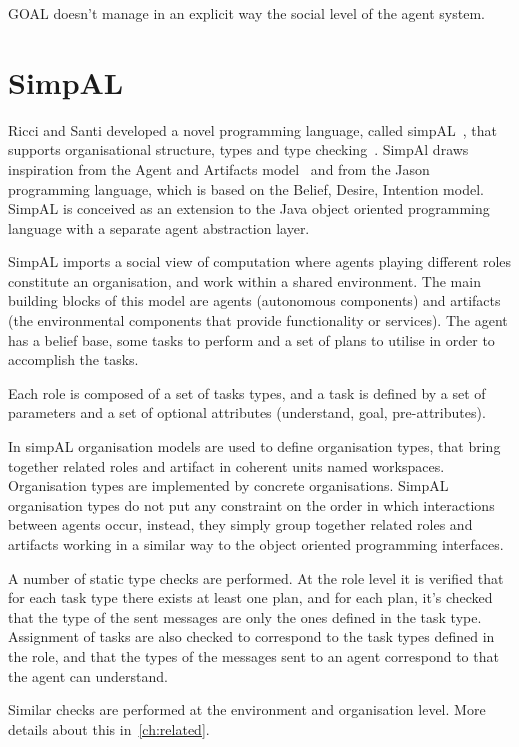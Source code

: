 \documentclass[a4paper,12pt,oneside,fleqn]{book} %
\begin{document}
GOAL doesn't manage in an explicit way the social level of the agent system.

\section{SimpAL} %
Ricci  and Santi developed a novel programming language, called
simpAL~\cite{DBLP:conf/oopsla/RicciS11,DBLP:conf/oopsla/RicciS12}, that
supports organisational structure, types and type
checking~\cite{DBLP:conf/promas/RicciS12}. SimpAl draws inspiration from
the Agent and Artifacts model~\cite{DBLP:conf/atal/RicciVO07} and from the
Jason programming language, which is based on the Belief, Desire, Intention
model. SimpAL is conceived as an extension to the Java object oriented
programming language with a separate agent abstraction layer.

SimpAL imports a social view of computation where agents playing different
roles constitute an organisation, and work within a shared environment. The
main building blocks of this model are agents (autonomous components) and
artifacts (the environmental components that provide functionality or
services). The agent has a belief base, some tasks to perform and a set of
plans to utilise in order to accomplish the tasks.

Each role is composed of a set of tasks types, and a task is defined by a
set of parameters and a set of optional attributes (understand, goal,
pre-attributes).

In simpAL organisation models are used to define organisation types, that
bring together related roles and artifact in coherent units named
workspaces. Organisation types are implemented by concrete organisations.
SimpAL organisation types do not put any constraint on the order in which
interactions between agents occur, instead, they simply group together
related roles and artifacts working in a similar way to the object oriented
programming interfaces.

A number of static type checks are performed. At the role level it is
verified that for each task type there exists at least one plan, and for
each plan, it's checked that the type of the sent messages are only the ones
defined in the task type. Assignment of tasks are also checked to
correspond to the task types defined in the role, and that the types of
the messages sent to an agent correspond to that the agent can understand.

Similar checks are performed at the environment and organisation level.
More details about this in~\autoref{ch:related}.
\end{document}
